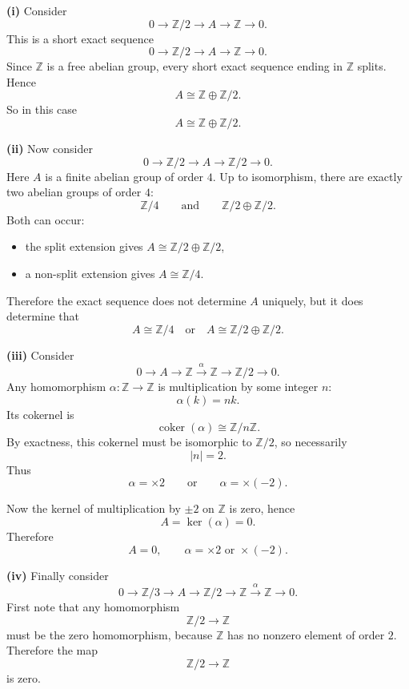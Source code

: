 \documentclass[12pt,a4paper]{article}
\theoremstyle{notespace}
\begin{document}
\medskip

\textbf{(i)} Consider
\[
0 \longrightarrow \mathbb Z/2 \longrightarrow A \longrightarrow \mathbb Z \longrightarrow 0.
\]
This is a short exact sequence
\[
0 \longrightarrow \mathbb Z/2 \longrightarrow A \longrightarrow \mathbb Z \longrightarrow 0.
\]
Since \(\mathbb Z\) is a free abelian group, every short exact sequence ending in \(\mathbb Z\) splits. Hence
\[
A \cong \mathbb Z \oplus \mathbb Z/2.
\]
So in this case
\[
\boxed{A \cong \mathbb Z \oplus \mathbb Z/2.}
\]

\medskip

\textbf{(ii)} Now consider
\[
0 \longrightarrow \mathbb Z/2 \longrightarrow A \longrightarrow \mathbb Z/2 \longrightarrow 0.
\]
Here \(A\) is a finite abelian group of order \(4\). Up to isomorphism, there are exactly two abelian groups of order \(4\):
\[
\mathbb Z/4 \qquad\text{and}\qquad \mathbb Z/2 \oplus \mathbb Z/2.
\]
Both can occur:

\begin{itemize}
	\item the split extension gives \(A \cong \mathbb Z/2 \oplus \mathbb Z/2\),
	\item a non-split extension gives \(A \cong \mathbb Z/4\).
\end{itemize}

Therefore the exact sequence does not determine \(A\) uniquely, but it does determine that
\[
\boxed{A \cong \mathbb Z/4 \quad\text{or}\quad A \cong \mathbb Z/2 \oplus \mathbb Z/2.}
\]

\medskip

\textbf{(iii)} Consider
\[
0 \longrightarrow A \longrightarrow \mathbb Z \xrightarrow{\alpha} \mathbb Z \longrightarrow \mathbb Z/2 \longrightarrow 0.
\]
Any homomorphism \(\alpha:\mathbb Z \to \mathbb Z\) is multiplication by some integer \(n\):
\[
\alpha(k)=nk.
\]
Its cokernel is
\[
\operatorname{coker}(\alpha)\cong \mathbb Z/n\mathbb Z.
\]
By exactness, this cokernel must be isomorphic to \(\mathbb Z/2\), so necessarily
\[
|n|=2.
\]
Thus
\[
\alpha=\times 2 \qquad\text{or}\qquad \alpha=\times (-2).
\]

Now the kernel of multiplication by \(\pm 2\) on \(\mathbb Z\) is zero, hence
\[
A=\ker(\alpha)=0.
\]
Therefore
\[
\boxed{A=0,\qquad \alpha=\times 2 \text{ or } \times(-2).}
\]

\medskip

\textbf{(iv)} Finally consider
\[
0 \longrightarrow \mathbb Z/3 \longrightarrow A \longrightarrow \mathbb Z/2 \longrightarrow \mathbb Z \xrightarrow{\alpha} \mathbb Z \longrightarrow 0.
\]
First note that any homomorphism
\[
\mathbb Z/2 \longrightarrow \mathbb Z
\]
must be the zero homomorphism, because \(\mathbb Z\) has no nonzero element of order \(2\). Therefore the map
\[
\mathbb Z/2 \longrightarrow \mathbb Z
\]
is zero.
\end{document}
